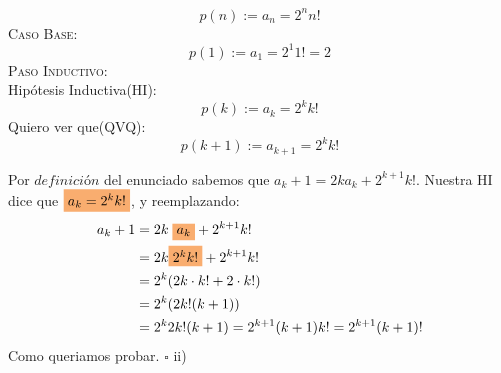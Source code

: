 \documentclass[a4paper,11pt]{article}
\begin{document}
\[p(n) := a_n = 2^n n!\]
\textsc{Caso Base}:\\
\[p(1):= a_1 = 2^1 1! = 2 \]
\textsc{Paso Inductivo}:\\
Hipótesis Inductiva(HI):\[p(k):= a_k = 2^k k!\]
Quiero ver que(QVQ):\[p(k+1):= a_{k+1} = 2^k k!\]

Por $\textit{definición}$ del enunciado sabemos que $a_k+1 = 2k a_k + 2^{k+1} k!$. Nuestra HI dice que $\colorbox{Apricot}{$a_k = 2^k k!$}$, y reemplazando:\\
\begin{align*}
a_k+1 & = 2k\; \colorbox{Apricot}{$a_k$} + 2^{k+1} k! \\
      & = 2k \colorbox{Apricot}{$2^k k!$} + 2^{k+1} k! \\
      & = 2^k (2k \cdot k! + 2 \cdot k!) \\
      & = 2^k (2k! (k + 1)) \\
      & = 2^k 2k! (k+1) = 2^{k+1} (k+1) k! = 2^{k+1} (k+1)!
\end{align*}
Como queriamos probar. 
\hfill$\square$
ii) 
\end{document}
